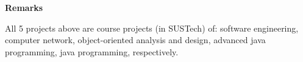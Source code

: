 \documentclass[a4paper,MMMyyyy,nonstopmode]{simpleresumecv}
\begin{document}
\begin{Body}
    \Gap

    \BulletItem
    \textbf{Remarks}
    \begin{Detail}
        \Item
        All 5 projects above are course projects (in SUSTech) of: software engineering, computer network, object-oriented analysis and design, advanced java programming, java programming, respectively.
    \end{Detail}














\end{Body}
\end{document}
